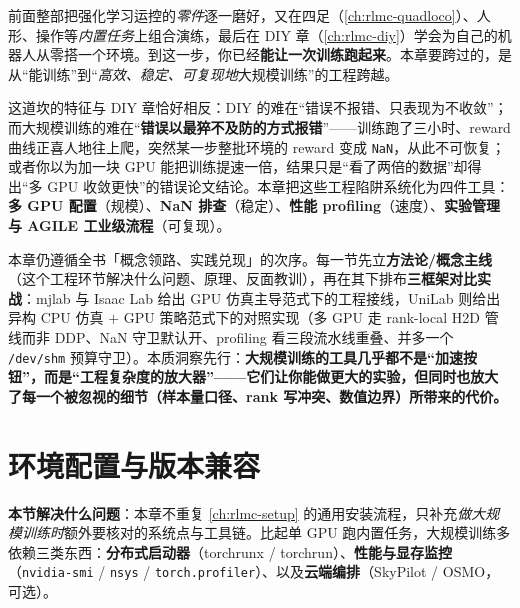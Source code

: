 前面整部把强化学习运控的\emph{零件}逐一磨好，又在四足（\cref{ch:rlmc-quadloco}）、人形、操作等\emph{内置任务}上组合演练，最后在 DIY 章（\cref{ch:rlmc-diy}）学会为自己的机器人从零搭一个环境。到这一步，你已经\textbf{能让一次训练跑起来}。本章要跨过的，是从“能训练”到“\emph{高效、稳定、可复现地}大规模训练”的工程跨越。

这道坎的特征与 DIY 章恰好相反：DIY 的难在“错误不报错、只表现为不收敛”；而大规模训练的难在“\textbf{错误以最猝不及防的方式报错}”——训练跑了三小时、reward 曲线正喜人地往上爬，突然某一步整批环境的 reward 变成 \texttt{NaN}，从此不可恢复；或者你以为加一块 GPU 能把训练提速一倍，结果只是“看了两倍的数据”却得出“多 GPU 收敛更快”的错误论文结论。本章把这些工程陷阱系统化为四件工具：\textbf{多 GPU 配置}（规模）、\textbf{NaN 排查}（稳定）、\textbf{性能 profiling}（速度）、\textbf{实验管理与 AGILE 工业级流程}（可复现）。

本章仍遵循全书「概念领路、实践兑现」的次序。每一节先立\textbf{方法论/概念主线}（这个工程环节解决什么问题、原理、反面教训），再在其下排布\textbf{三框架对比实战}：mjlab 与 Isaac Lab 给出 GPU 仿真主导范式下的工程接线，UniLab 则给出异构 CPU 仿真 $+$ GPU 策略范式下的对照实现（多 GPU 走 rank-local H2D 管线而非 DDP、NaN 守卫默认开、profiling 看三段流水线重叠、并多一个 \verb|/dev/shm| 预算守卫）。本质洞察先行：\textbf{大规模训练的工具几乎都不是“加速按钮”，而是“工程复杂度的放大器”——它们让你能做更大的实验，但同时也放大了每一个被忽视的细节（样本量口径、rank 写冲突、数值边界）所带来的代价。}

\section{环境配置与版本兼容}
\label{sec:rlmc-ls-setup}

\textbf{本节解决什么问题}：本章不重复 \cref{ch:rlmc-setup} 的通用安装流程，只补充\emph{做大规模训练时}额外要核对的系统点与工具链。比起单 GPU 跑内置任务，大规模训练多依赖三类东西：\textbf{分布式启动器}（torchrunx / torchrun）、\textbf{性能与显存监控}（\texttt{nvidia-smi} / \texttt{nsys} / \texttt{torch.\allowbreak profiler}）、以及\textbf{云端编排}（SkyPilot / OSMO，可选）。

